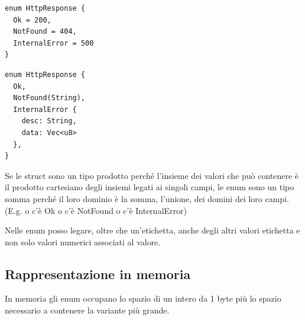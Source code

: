 \begin{center}
  \centering
  \begin{minipage}{\linewidth}
    \begin{minipage}{0.47\linewidth}

      \begin{verbatim}
enum HttpResponse {
  Ok = 200,
  NotFound = 404,
  InternalError = 500
}
\end{verbatim}

    \end{minipage}%
    \hfill
    \begin{minipage}{\linewidth}
      \begin{minipage}{0.47\linewidth}

        \begin{verbatim}
enum HttpResponse {
  Ok,
  NotFound(String),
  InternalError {
    desc: String,
    data: Vec<u8> 
  },
}
\end{verbatim}
      \end{minipage}
    \end{minipage}
  \end{minipage}
\end{center}

Se le struct sono un tipo prodotto perché l'insieme dei valori che può contenere è il prodotto
cartesiano degli insiemi legati ai singoli campi, le enum sono un tipo somma
perché il loro dominio è la somma, l'unione, dei domini dei loro campi. (E.g. o c'è Ok o c'è NotFound o c'è InternalError)


Nelle enum posso legare, oltre che un'etichetta, anche degli altri valori etichetta e non
solo valori numerici associati al valore.


\subsection{Rappresentazione in memoria}

In memoria gli enum occupano lo spazio di un intero da 1 byte più lo spazio
necessario a contenere la variante più grande.


